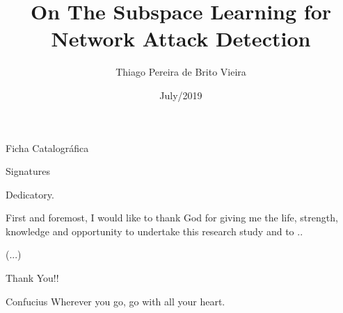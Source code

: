 \documentclass[en, oneside, onehalfspacing]{risethesis}
\title{On The Subspace Learning for Network Attack Detection}
\date{July/2019}
\author{Thiago Pereira de Brito Vieira}
\begin{document}
\frontmatter
\frontpage
\presentationpage

\begin{dedicatory}Ficha Catalográfica\end{dedicatory}

\begin{dedicatory}Signatures\end{dedicatory}

\begin{dedicatory}Dedicatory.\end{dedicatory}

\agradecimentos
First and foremost, I would like to thank God for giving me the life, strength, knowledge and opportunity to undertake this research study and to ..

(...)

Thank You!!

\begin{epigraph}[]{Confucius}
	Wherever you go, go with all your heart.
\end{epigraph}

\resumo


\abstract


\tableofcontents

\makeatletter
\renewcommand{\@thesubfigure}{\thesubfigure:\hskip\subfiglabelskip}
\makeatother
\setcounter{lofdepth}{2}

\listoffigures
\listoftables


\mainmatter
	






\appendix



	



\clearpage
\addappheadtotoc
\end{document}
